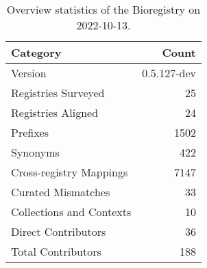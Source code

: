 \begin{table}
\centering
\caption{Overview statistics of the Bioregistry on 2022-10-13.}
\label{tab:bioregistry-summary}
\begin{tabular}{lr}
\toprule
                Category &       Count \\
\midrule
                 Version & 0.5.127-dev \\
     Registries Surveyed &          25 \\
      Registries Aligned &          24 \\
                Prefixes &        1502 \\
                Synonyms &         422 \\
 Cross-registry Mappings &        7147 \\
      Curated Mismatches &          33 \\
Collections and Contexts &          10 \\
     Direct Contributors &          36 \\
      Total Contributors &         188 \\
\bottomrule
\end{tabular}
\end{table}
